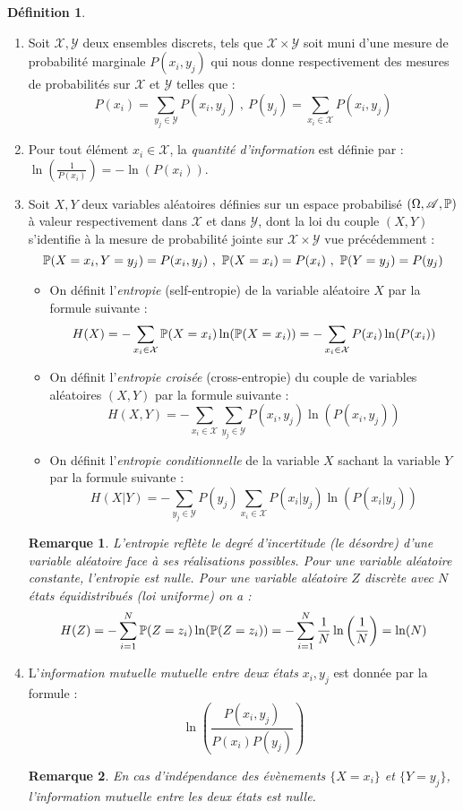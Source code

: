 \documentclass[12pt]{article}
\newtheorem{rmq}{Remarque}
\theoremstyle{definition}
\newtheorem{defi}{Définition}
\begin{document}
	\begin{defi}\hfil\\
		\begin{enumerate}
			\item Soit $\mathcal{X},\mathcal{Y}$ deux ensembles discrets, tels  que $\mathcal{X}\times \mathcal{Y}$ soit muni d'une mesure de probabilité marginale $P(x_i,y_j)$ qui nous donne respectivement des mesures de probabilités sur $\mathcal{X}$ et $\mathcal{Y}$ telles que : 
			$$P(x_i) = \sum_{y_j\in \mathcal{Y}}P(x_i,y_j) \ ,\ P(y_j) = \sum_{x_i\in \mathcal{X}}P(x_i,y_j)$$ 
			\item Pour tout élément $x_i\in \mathcal{X}$, la \textit{quantité d'information} est définie par : $\ln\left(\frac{1}{P(x_i)}\right) = -\ln\left(P(x_i)\right)$.
			\item Soit $X,Y$ deux variables aléatoires définies sur un espace probabilisé $(\Omega,\mathscr{A},\mathbb{P})$ à valeur respectivement dans $\mathcal{X}$ et dans $\mathcal{Y}$, dont la loi du couple $(X,Y)$ s'identifie à la mesure de probabilité jointe sur $\mathcal{X}\times \mathcal{Y}$ vue précédemment : 
			$$\mathbb{P}(X = x_i, Y= y_j) = P(x_i,y_j) \ ,\ \mathbb{P}(X = x_i) = P(x_i) \ ,\ \mathbb{P}(Y = y_j) = P(y_j)$$
			
			\begin{itemize}
				\item On définit l'\textit{entropie} (self-entropie) de la variable aléatoire $X$ par la formule suivante : 
				$$H(X) = - \sum_{x_i\in \mathcal{X}}\mathbb{P}(X=x_i)\ln(\mathbb{P}(X=x_i)) = - \sum_{x_i\in \mathcal{X}}P(x_i)\ln(P(x_i))$$
				\item On définit l'\textit{entropie croisée} (cross-entropie) du couple de variables aléatoires $(X,Y)$ par la formule suivante : 
				$$H(X,Y) = - \sum_{x_i\in \mathcal{X}}\sum_{y_j\in \mathcal{Y}}P(x_i,y_j)\ln(P(x_i,y_j))$$
				\item On définit l'\textit{entropie conditionnelle} de la variable $X$ sachant la variable $Y$ par la formule suivante : 
				$$H(X|Y) = -\sum_{y_j\in \mathcal{Y}} P(y_j)\sum_{x_i\in \mathcal{X}}P(x_i|y_j)\ln(P(x_i|y_j))$$
			\end{itemize}
		\begin{rmq}
			L'entropie reflète le degré d'incertitude (le désordre) d'une variable aléatoire face à ses réalisations possibles. Pour une variable aléatoire constante, l'entropie est nulle. Pour une variable aléatoire $Z$ discrète avec $N$ états équidistribués (loi uniforme) on a :
			$$H(Z) = - \sum_{i=1}^{N}\mathbb{P}(Z=z_i)\ln(\mathbb{P}(Z=z_i)) = - \sum_{i=1}^{N}\frac{1}{N}\ln\left(\frac{1}{N}\right) = \ln(N)$$
		\end{rmq}
			\item L'\textit{information mutuelle mutuelle entre deux états} $x_i,y_j$ est donnée par la formule : $$\ln\left(\dfrac{P(x_i,y_j)}{P(x_i)P(y_j)}\right)$$
			\begin{rmq}
				En cas d'indépendance des évènements $\{X=x_i\}$ et $\{Y=y_j\}$, l'information mutuelle entre les deux états est nulle.  
			\end{rmq}
		

\end{enumerate}
\end{defi}
\end{document}
